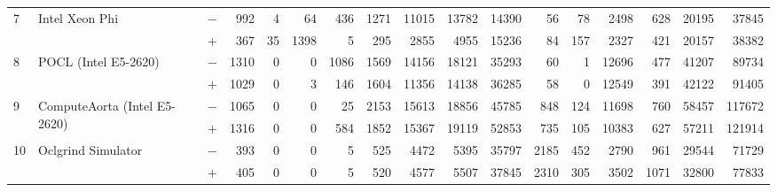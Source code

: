 \begin{tabular}{lll | rrrrrrr | rrrrrrr }
\hline
\multirow{ 2}{*}{7} & \multirow{ 2}{*}{Intel Xeon Phi} & $-$ & 992 & 4 & 64 & 436 & 1271 & 11015 & 13782       & 14390 & 56 & 78 & 2498 & 628 & 20195 & 37845 \\& & $+$ & 367 & 35 & 1398 & 5 & 295 & 2855 & 4955 & 15236 & 84 & 157 & 2327 & 421 & 20157 & 38382 \\
\hline
\multirow{ 2}{*}{8} & \multirow{ 2}{*}{POCL (Intel E5-2620)} & $-$ & 1310 & 0 & 0 & 1086 & 1569 & 14156 & 18121       & 35293 & 60 & 1 & 12696 & 477 & 41207 & 89734 \\& & $+$ & 1029 & 0 & 3 & 146 & 1604 & 11356 & 14138 & 36285 & 58 & 0 & 12549 & 391 & 42122 & 91405 \\
\hline
\multirow{ 2}{*}{9} & \multirow{ 2}{*}{ComputeAorta (Intel E5-2620)} & $-$ & 1065 & 0 & 0 & 25 & 2153 & 15613 & 18856       & 45785 & 848 & 124 & 11698 & 760 & 58457 & 117672 \\& & $+$ & 1316 & 0 & 0 & 584 & 1852 & 15367 & 19119 & 52853 & 735 & 105 & 10383 & 627 & 57211 & 121914 \\
\hline
\multirow{ 2}{*}{10} & \multirow{ 2}{*}{Oclgrind Simulator} & $-$ & 393 & 0 & 0 & 5 & 525 & 4472 & 5395       & 35797 & 2185 & 452 & 2790 & 961 & 29544 & 71729 \\& & $+$ & 405 & 0 & 0 & 5 & 520 & 4577 & 5507 & 37845 & 2310 & 305 & 3502 & 1071 & 32800 & 77833 \\
  \bottomrule
\end{tabular}

